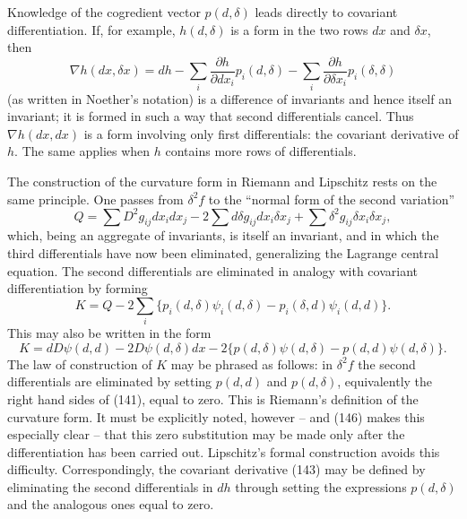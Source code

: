 \documentclass[12pt]{article}
\begin{document}
Knowledge of the cogredient vector $p(d,\delta)$ leads directly to covariant differentiation. If, for example, $h(d,\delta)$ is a form in the two rows $dx$ and $\delta x$, then
\begin{equation}
  \nabla h(dx,\delta x)=dh-\sum_i \frac{\partial h}{\partial dx_i}p_i(d,\delta)-\sum_i\frac{\partial h}{\partial \delta x_i}p_i(\delta,\delta)            \tag{143}
\end{equation}
(as written in Noether's notation) is a difference of invariants and hence itself an invariant; it is formed in such a way that second differentials cancel. Thus $\nabla h(dx,dx)$ is a form involving only first differentials: the covariant derivative of $h$. The same applies when $h$ contains more rows of differentials.

The construction of the curvature form in Riemann and Lipschitz rests on the same principle. One passes from $\delta^2 f$ to the ``normal form of the second variation''
\begin{equation}
  Q=\sum D^2g_{ij}dx_i dx_j-2\sum d\delta g_{ij}dx_i\delta x_j+\sum \delta^2 g_{ij}\delta x_i\delta x_j,             \tag{144}
\end{equation}
which, being an aggregate of invariants, is itself an invariant, and in which the third differentials have now been eliminated, generalizing the Lagrange central equation. The second differentials are eliminated in analogy with covariant differentiation by forming
\begin{equation}
  K=Q-2\sum_i\{p_i(d,\delta)\psi_i(d,\delta)-p_i(\delta,d)\psi_i(d,d)\}.       \tag{145}
\end{equation}
This may also be written in the form
\begin{equation}
  K=dD\psi(d,d)-2D\psi(d,\delta)dx-2\{p(d,\delta)\psi(d,\delta)-p(d,d)\psi(d,\delta)\}.       \tag{146}
\end{equation}
The law of construction of $K$ may be phrased as follows: in $\delta^2 f$ the second differentials are eliminated by setting $p(d,d)$ and $p(d,\delta)$, equivalently the right hand sides of (141), equal to zero. This is Riemann's definition of the curvature form. It must be explicitly noted, however -- and (146) makes this especially clear -- that this zero substitution may be made only after the differentiation has been carried out. Lipschitz's formal construction avoids this difficulty. Correspondingly, the covariant derivative (143) may be defined by eliminating the second differentials in $dh$ through setting the expressions $p(d,\delta)$ and the analogous ones equal to zero.
\end{document}
